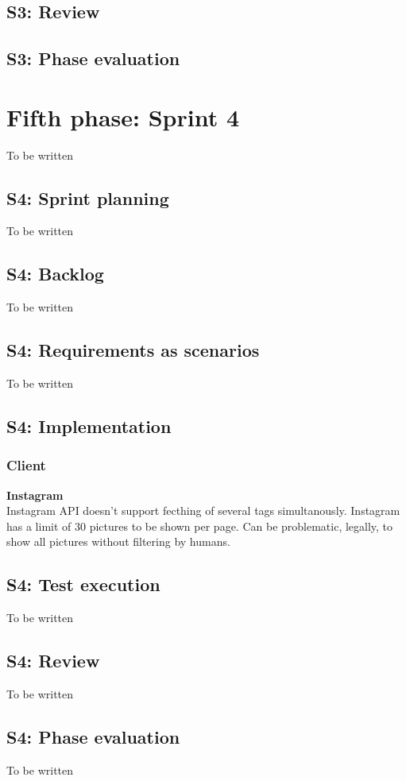 \documentclass[11pt]{book}
\begin{document}
\subsection{S3: Review}
\subsection{S3: Phase evaluation}

\section{Fifth phase: Sprint 4}
To be written
\subsection{S4: Sprint planning}
To be written
\subsection{S4: Backlog}
To be written
\subsection{S4: Requirements as scenarios}
To be written
\subsection{S4: Implementation}

\subsubsection{Client}
\textbf{Instagram}\\
Instagram API doesn’t support fecthing of several tags simultanously.
Instagram has a limit of 30 pictures to be shown per page. 
Can be problematic, legally, to show all pictures without filtering by humans.

\subsection{S4: Test execution}
To be written
\subsection{S4: Review}
To be written
\subsection{S4: Phase evaluation}
To be written
\end{document}
